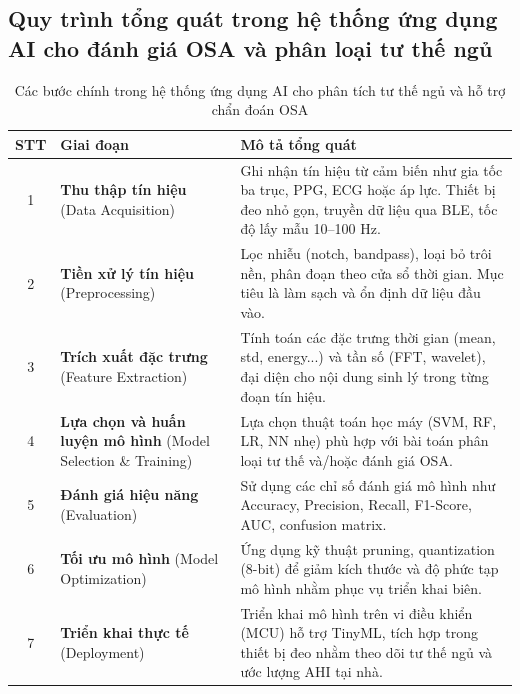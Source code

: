 \subsection{Quy trình tổng quát trong hệ thống ứng dụng AI cho đánh giá OSA và phân loại tư thế ngủ}
\begin{table}[htbp]
\centering
\caption{Các bước chính trong hệ thống ứng dụng AI cho phân tích tư thế ngủ và hỗ trợ chẩn đoán OSA}
\label{tab:pipeline_steps}
\small
\renewcommand{\arraystretch}{1.2}
\begin{tabular}{|c|p{3.8cm}|p{9.2cm}|}
\hline
\textbf{STT} & \textbf{Giai đoạn} & \textbf{Mô tả tổng quát} \\
\hline
1 & \textbf{Thu thập tín hiệu} \newline (Data Acquisition) & Ghi nhận tín hiệu từ cảm biến như gia tốc ba trục, PPG, ECG hoặc áp lực. Thiết bị đeo nhỏ gọn, truyền dữ liệu qua BLE, tốc độ lấy mẫu 10–100 Hz. \\
\hline
2 & \textbf{Tiền xử lý tín hiệu} \newline (Preprocessing) & Lọc nhiễu (notch, bandpass), loại bỏ trôi nền, phân đoạn theo cửa sổ thời gian. Mục tiêu là làm sạch và ổn định dữ liệu đầu vào. \\
\hline
3 & \textbf{Trích xuất đặc trưng} \newline (Feature Extraction) & Tính toán các đặc trưng thời gian (mean, std, energy...) và tần số (FFT, wavelet), đại diện cho nội dung sinh lý trong từng đoạn tín hiệu. \\
\hline
4 & \textbf{Lựa chọn và huấn luyện mô hình} \newline (Model Selection \& Training) & Lựa chọn thuật toán học máy (SVM, RF, LR, NN nhẹ) phù hợp với bài toán phân loại tư thế và/hoặc đánh giá OSA. \\
\hline
5 & \textbf{Đánh giá hiệu năng} \newline (Evaluation) & Sử dụng các chỉ số đánh giá mô hình như Accuracy, Precision, Recall, F1-Score, AUC, confusion matrix. \\
\hline
6 & \textbf{Tối ưu mô hình} \newline (Model Optimization) & Ứng dụng kỹ thuật pruning, quantization (8-bit) để giảm kích thước và độ phức tạp mô hình nhằm phục vụ triển khai biên. \\
\hline
7 & \textbf{Triển khai thực tế} \newline (Deployment) & Triển khai mô hình trên vi điều khiển (MCU) hỗ trợ TinyML, tích hợp trong thiết bị đeo nhằm theo dõi tư thế ngủ và ước lượng AHI tại nhà. \\
\hline
\end{tabular}
\end{table}



